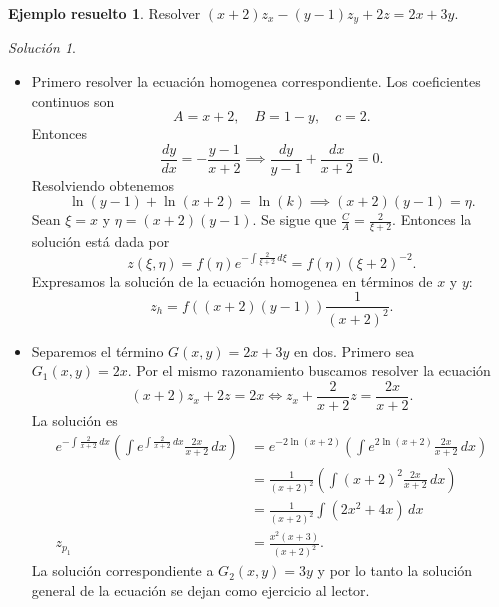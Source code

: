 \documentclass[11pt,letterpaper,draft]{report}
\theoremstyle{plain}
\theoremstyle{definition}
\newtheorem{solved}[theorem]{Ejemplo resuelto}
\theoremstyle{remark}
\newtheorem*{solution}{Solución}
\newcommand\<{\langle}
\renewcommand\>{\rangle}
\begin{document}
\begin{solved}
  Resolver $(x+2)z_x - (y-1)z_y + 2z = 2x + 3y$.
  \begin{solution}
    \begin{itemize}
      \item Primero resolver la ecuación homogenea
        correspondiente. Los coeficientes continuos son
        \[
        A = x + 2, \quad B = 1 - y, \quad c = 2.
        \] 
        Entonces
        \[
        \frac{dy}{dx} = -\frac{y-1}{x+2} \implies
        \frac{dy}{y-1} + \frac{dx}{x+2} = 0.
        \] 
        Resolviendo obtenemos
        \[
        \ln(y-1) + \ln(x+2) = \ln(k) \implies (x+2)(y-1) =
        \eta.
        \] 
        Sean $\xi = x$ y $\eta = (x+2)(y-1)$. Se sigue que
        $\frac{C}{A} = \frac{2}{\xi + 2}$. Entonces la
        solución está dada por
        \[
        z(\xi,\eta) = f(\eta)e^{-\int \frac{2}{\xi+2} \,
        d\xi} = f(\eta)(\xi+2)^{-2}.
        \] 
        Expresamos la solución de la ecuación homogenea en
        términos de $x$ y $y$:
        \[
        z_h = f((x+2)(y-1)) \frac{1}{(x+2)^2}.
        \] 
      \item Separemos el término $G(x,y) = 2x + 3y$ en dos.
        Primero sea $G_1(x,y) = 2x$. Por el mismo
        razonamiento buscamos resolver la ecuación 
        \[
          (x+2)z_x + 2z = 2x \iff z_x + \frac{2}{x+2}z =
          \frac{2x}{x+2}.
        \] 
        La solución es
        \begin{align*}
          e^{-\int \frac{2}{x+2} \, dx} \left(\int e^{\int
            \frac{2}{x+2} \, dx} \frac{2x}{x+2} \, dx\right)
            &=
            e^{-2\ln(x+2)}\left(\int e^{2\ln(x+2)}
            \frac{2x}{x+2} \, dx\right)\\
            &=
            \frac{1}{(x+2)^2}\left(\int (x+2)^2
            \frac{2x}{x+2} \, dx\right)\\
            &= \frac{1}{(x+2)^2} \int
            \left(2x^2 + 4x\right) \, dx\\
            z_{p_1} &= \frac{x^2(x+3)}{(x+2)^2}.
        \end{align*}
        La solución correspondiente a $G_2(x,y) = 3y$ y por
        lo tanto la solución general de la ecuación se dejan
        como ejercicio al lector.
    \end{itemize}
  \end{solution}
\end{solved}
\end{document}
